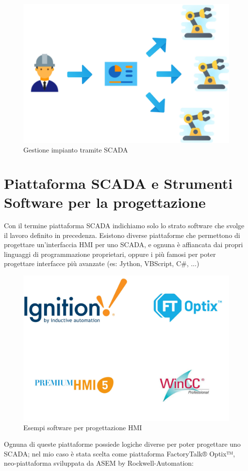 \begin{figure}
    \centering
    \includegraphics[width=0.5\linewidth]{Immagini/Operatore_SCADA.jpg}
    \caption{Gestione impianto tramite SCADA}
    \label{fig:Operatore_SCADA.jpg}
\end{figure}

\section{Piattaforma SCADA e Strumenti Software per la progettazione}
Con il termine piattaforma SCADA indichiamo solo lo strato software che svolge il lavoro definito in precedenza. Esistono diverse piattaforme che permettono di progettare un'interfaccia HMI per uno SCADA, e ognuna è affiancata dai propri linguaggi di programmazione proprietari, oppure i più famosi per poter progettare interfacce più avanzate (es: Jython, VBScript, C\#, ...)

\begin{figure} [ht]
    \centering
    \includegraphics[width=0.5\linewidth]{Immagini/loghi.jpg}
    \caption{Esempi software per progettazione HMI}
    \label{fig:loghi.jpg}
\end{figure}

Ognuna di queste piattaforme possiede logiche diverse per poter progettare uno SCADA; nel mio caso è stata scelta come piattaforma FactoryTalk® Optix™, neo-piattaforma sviluppata da ASEM by Rockwell-Automation: 

